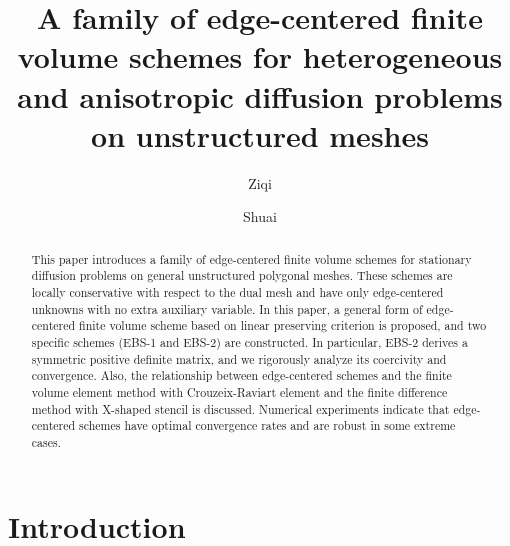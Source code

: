 \documentclass[times,review,preprint,authoryear]{elsarticle}
\begin{document}

\begin{frontmatter}

\title{A family of edge-centered finite volume schemes for heterogeneous and anisotropic diffusion problems on unstructured meshes}

\author[1]{Ziqi }

\author[2]{Shuai }

\address[1]{Department of Mathematical Sciences, Tsinghua University, Beijing 100084, PR China}
\address[2]{Graduate School of China Academy of Engineering Physics,  Beijing, 100088, PR China}

\received{***}
\finalform{***}
\accepted{***}
\availableonline{***}
\communicated{***}

\begin{abstract}
This paper introduces a family of edge-centered finite volume schemes for stationary diffusion problems on general unstructured polygonal meshes. These schemes are locally conservative with respect to the dual mesh and have only edge-centered unknowns with no extra auxiliary variable.
In this paper, a general form of edge-centered finite volume scheme based on linear preserving criterion is proposed, and two specific schemes (EBS-1 and EBS-2) are constructed. In particular, EBS-2 derives a symmetric positive definite matrix, and we rigorously analyze its coercivity and convergence.
Also, the relationship between edge-centered schemes and the finite volume element method with Crouzeix-Raviart element and the finite difference method with X-shaped stencil is discussed.
Numerical experiments indicate that edge-centered schemes have optimal convergence rates and are robust in some extreme cases.
\end{abstract}


\end{frontmatter}

\section{Introduction}\label{sec1}
\end{document}
